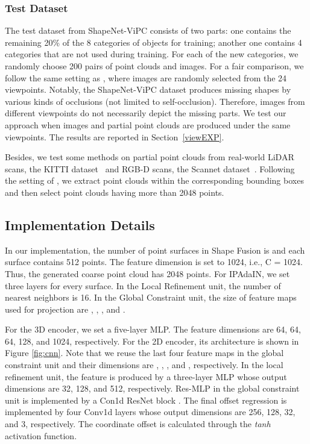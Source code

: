 \subsubsection{Test Dataset}
The test dataset from ShapeNet-ViPC \cite{zhang2021view} consists of two parts: one contains the remaining 20\% of the 8 categories of objects for training; another one contains 4 categories that are not used during training. For each of the new categories, we randomly choose 200 pairs of point clouds and images. For a fair comparison, we follow the same setting as \cite{zhang2021view}, where images are randomly selected from the 24 viewpoints. Notably, the ShapeNet-ViPC dataset produces missing shapes by various kinds of occlusions (not limited to self-occlusion). Therefore, images from different viewpoints do not necessarily depict the missing parts. We test our approach when images and partial point clouds are produced under the same viewpoints. The results are reported in Section~\ref{viewEXP}.

Besides, we test some methods on partial point clouds from real-world LiDAR scans, the KITTI dataset~\cite{geiger2013vision} and RGB-D scans, the Scannet dataset~\cite{dai2017scannet}. Following the setting of \cite{yuan2018pcn}, we extract point clouds within the corresponding bounding boxes and then select point clouds having more than 2048 points.
\subsection{Implementation Details}
\label{detail}
In our implementation, the number of point surfaces in Shape Fusion is  and each surface contains 512 points. The feature dimension is set to 1024, i.e., C = 1024. Thus, the generated coarse point cloud has 2048 points. For IPAdaIN, we set three layers for every surface. In the Local Refinement unit, the number of nearest neighbors is 16. In the Global Constraint unit, the size of feature maps used for projection are , , , and .

For the 3D encoder, we set a five-layer MLP. The feature dimensions are 64, 64, 64, 128, and 1024, respectively. For the 2D encoder, its architecture is shown in Figure \ref{fig:cnn}. 
Note that we reuse the last four feature maps in the global constraint unit and their dimensions are , , , and , respectively.
In the local refinement unit, the feature \emph{} is produced by a three-layer MLP whose output dimensions are 32, 128, and 512, respectively. Res-MLP in the global constraint unit is implemented by a Con1d ResNet block \cite{he2016deep}. The final offset regression is implemented by four Conv1d layers whose output dimensions are 256, 128, 32, and 3, respectively. The coordinate offset is calculated through the \emph{tanh} activation function.

